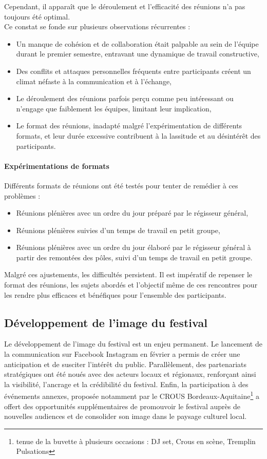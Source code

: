 \documentclass[12pt,a4paper]{report}
\begin{document}
Cependant, il apparaît que le déroulement et l’efficacité des réunions n’a pas toujours été optimal.\\

Ce constat se fonde sur plusieurs observations récurrentes :
\begin{itemize}
\item Un manque de cohésion et de collaboration était palpable au sein de l'équipe durant le premier semestre, entravant une dynamique de travail constructive,
\item Des conflits et attaques personnelles fréquents entre participants créent un climat néfaste à la communication et à l'échange,
\item Le déroulement des réunions parfois perçu comme peu intéressant ou n'engage que faiblement les équipes, limitant leur implication,
\item Le format des réunions, inadapté malgré l’expérimentation de différents formats, et leur durée excessive contribuent à la lassitude et au désintérêt des participants.
\end{itemize}

\paragraph{Expérimentations de formats}
Différents formats de réunions ont été testés pour tenter de remédier à ces problèmes :
\begin{itemize}
\item Réunions plénières avec un ordre du jour préparé par le régisseur général,
\item Réunions plénières suivies d'un temps de travail en petit groupe,
\item Réunions plénières avec un ordre du jour élaboré par le régisseur général à partir des remontées des pôles, suivi d'un temps de travail en petit groupe.\\
\end{itemize}
Malgré ces ajustements, les difficultés persistent. Il est impératif de repenser le format des réunions, les sujets abordés et l'objectif même de ces rencontres pour les rendre plus efficaces et bénéfiques pour l'ensemble des participants.

\subsection{Développement de l'image du festival}
Le développement de l'image du festival est un enjeu permanent. Le lancement de la communication sur Facebook Instagram en février a permis de créer une anticipation et de susciter l'intérêt du public. Parallèlement, des partenariats stratégiques ont été noués avec des acteurs locaux et régionaux, renforçant ainsi la visibilité, l’ancrage et la crédibilité du festival. Enfin, la participation à des événements annexes, proposée notamment par le CROUS Bordeaux-Aquitaine\footnote{tenue de la buvette à plusieurs occasions : DJ set, Crous en scène, Tremplin Pulsations} a offert des opportunités supplémentaires de promouvoir le festival auprès de nouvelles audiences et de consolider son image dans le paysage culturel local.\\
\end{document}
